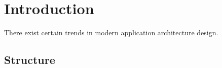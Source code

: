 
\section{Introduction}\label{sec:introduction}

There exist certain trends in modern application architecture design.

\subsection{Structure}
